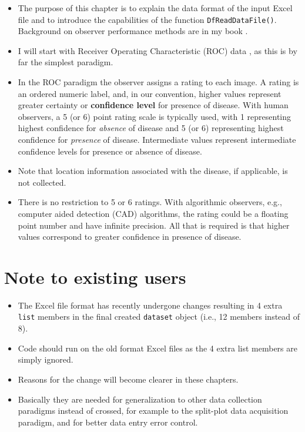 \documentclass[
]{book}
\providecommand{\tightlist}{%
  \setlength{\itemsep}{0pt}\setlength{\parskip}{0pt}}
\begin{document}
\begin{itemize}
\tightlist
\item
  The purpose of this chapter is to explain the data format of the input Excel file and to introduce the capabilities of the function \texttt{DfReadDataFile()}. Background on observer performance methods are in my book \citep{RN2680}.
\item
  I will start with Receiver Operating Characteristic (ROC) data \citep{RN1766}, as this is by far the simplest paradigm.
\item
  In the ROC paradigm the observer assigns a rating to each image. A rating is an ordered numeric label, and, in our convention, higher values represent greater certainty or \textbf{confidence level} for presence of disease. With human observers, a 5 (or 6) point rating scale is typically used, with 1 representing highest confidence for \emph{absence} of disease and 5 (or 6) representing highest confidence for \emph{presence} of disease. Intermediate values represent intermediate confidence levels for presence or absence of disease.
\item
  Note that location information associated with the disease, if applicable, is not collected.
\item
  There is no restriction to 5 or 6 ratings. With algorithmic observers, e.g., computer aided detection (CAD) algorithms, the rating could be a floating point number and have infinite precision. All that is required is that higher values correspond to greater confidence in presence of disease.
\end{itemize}

\hypertarget{note-to-existing-users}{%
\section{Note to existing users}\label{note-to-existing-users}}

\begin{itemize}
\tightlist
\item
  The Excel file format has recently undergone changes resulting in 4 extra \texttt{list} members in the final created \texttt{dataset} object (i.e., 12 members instead of 8).
\item
  Code should run on the old format Excel files as the 4 extra list members are simply ignored.
\item
  Reasons for the change will become clearer in these chapters.
\item
  Basically they are needed for generalization to other data collection paradigms instead of crossed, for example to the split-plot data acquisition paradigm, and for better data entry error control.
\end{itemize}
\end{document}
